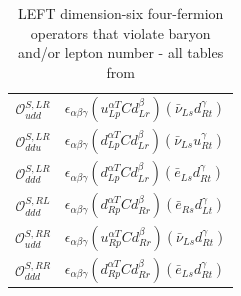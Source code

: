 \begin{table}[htbp]
{\begin{tabular}[t]{c|l}
        $\mathcal{O}_{udd}^{S,LR}$ & $\epsilon_{\alpha\beta\gamma}(u_{Lp}^{\alpha T} C d_{Lr}^\beta)(\bar{\nu}_{Ls} d_{Rt}^\gamma)$ \\
        $\mathcal{O}_{ddu}^{S,LR}$ & $\epsilon_{\alpha\beta\gamma}(d_{Lp}^{\alpha T} C d_{Lr}^\beta)(\bar{\nu}_{Ls} u_{Rt}^\gamma)$ \\
        $\mathcal{O}_{ddd}^{S,LR}$ & $\epsilon_{\alpha\beta\gamma}(d_{Lp}^{\alpha T} C d_{Lr}^\beta)(\bar{e}_{Ls} d_{Rt}^\gamma)$ \\
        $\mathcal{O}_{ddd}^{S,RL}$ & $\epsilon_{\alpha\beta\gamma}(d_{Rp}^{\alpha T} C d_{Rr}^\beta)(\bar{e}_{Rs} d_{Lt}^\gamma)$ \\
        $\mathcal{O}_{udd}^{S,RR}$ & $\epsilon_{\alpha\beta\gamma}(u_{Rp}^{\alpha T} C d_{Rr}^\beta)(\bar{\nu}_{Ls} d_{Rt}^\gamma)$ \\
        $\mathcal{O}_{ddd}^{S,RR}$ & $\epsilon_{\alpha\beta\gamma}(d_{Rp}^{\alpha T} C d_{Rr}^\beta)(\bar{e}_{Ls} d_{Rt}^\gamma)$
    \end{tabular}
    } %
    \caption{LEFT dimension-six four-fermion operators that violate baryon and/or lepton number - all tables from \parencite[p.33]{jenkins2018lowOM}}
    \label{tab:LEFTbasisLNV}
\end{table}


